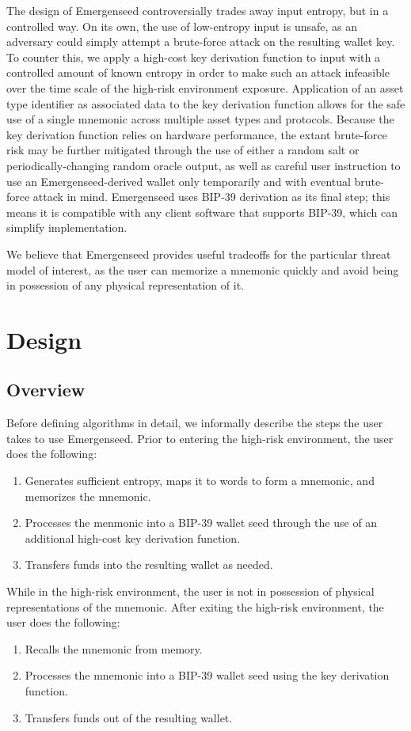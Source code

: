 \documentclass{article}
\begin{document}
The design of Emergenseed controversially trades away input entropy, but in a controlled way.
On its own, the use of low-entropy input is unsafe, as an adversary could simply attempt a brute-force attack on the resulting wallet key.
To counter this, we apply a high-cost key derivation function to input with a controlled amount of known entropy in order to make such an attack infeasible over the time scale of the high-risk environment exposure.
Application of an asset type identifier as associated data to the key derivation function allows for the safe use of a single mnemonic across multiple asset types and protocols.
Because the key derivation function relies on hardware performance, the extant brute-force risk may be further mitigated through the use of either a random salt or periodically-changing random oracle output, as well as careful user instruction to use an Emergenseed-derived wallet only temporarily and with eventual brute-force attack in mind.
Emergenseed uses BIP-39 derivation as its final step; this means it is compatible with any client software that supports BIP-39, which can simplify implementation.

We believe that Emergenseed provides useful tradeoffs for the particular threat model of interest, as the user can memorize a mnemonic quickly and avoid being in possession of any physical representation of it.


\section{Design}

\subsection{Overview}

Before defining algorithms in detail, we informally describe the steps the user takes to use Emergenseed.
Prior to entering the high-risk environment, the user does the following:
\begin{enumerate}
	\item Generates sufficient entropy, maps it to words to form a mnemonic, and memorizes the mnemonic.
	\item Processes the menmonic into a BIP-39 wallet seed through the use of an additional high-cost key derivation function.
	\item Transfers funds into the resulting wallet as needed.
\end{enumerate}
While in the high-risk environment, the user is not in possession of physical representations of the mnemonic.
After exiting the high-risk environment, the user does the following:
\begin{enumerate}
	\item Recalls the mnemonic from memory.
	\item Processes the mnemonic into a BIP-39 wallet seed using the key derivation function.
	\item Transfers funds out of the resulting wallet.
\end{enumerate}
\end{document}
